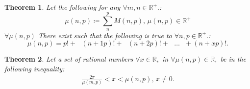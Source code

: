 \documentclass[10pt]{article}
\theoremstyle{plain}
\newtheorem{theorem}{Theorem}[section]
\theoremstyle{definition}
\theoremstyle{remark}
\begin{document}
\begin{theorem}
	Let the following for any $\forall m, n \in \mathbb{R}^{+}.$:
\begin{equation}
    \mu(n, p) \coloneq \sum_{n}^{p} M(n, p), \, \mu(n, p) \in \mathbb{R}^{+}
\end{equation}
	$\forall \mu(n, p)$ There exist such that the following is true to $\forall n, p \in \mathbb{R}^{+}.$:
\begin{equation}
    \mu(n, p) = p! + \text{ } (n+1p)! + \text{ } (n+2p)! + \text{ } \dots \text{ } + (n+xp)!.
\end{equation}
\end{theorem}

\begin{theorem}
	Let a set of rational numbers $\forall x \in \mathbb{R},$ in $\forall \mu(n, p) \in \mathbb{R},$ be in the following inequality:
	\begin{align*}
		\frac{2\pi}{\mu(m, p)} < x < \mu(n, p), \, x \neq 0.
	\end{align*}
\end{theorem}
\end{document}

